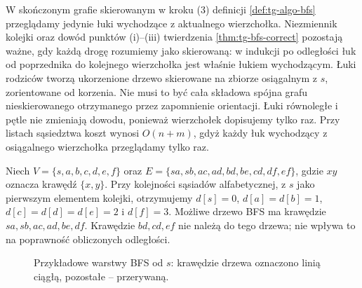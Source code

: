 \begin{uwaga}
\label{rem:tg-bfs-directed}
W skończonym grafie skierowanym w kroku (3)
definicji \ref{def:tg-algo-bfs} przeglądamy jedynie
łuki wychodzące z aktualnego wierzchołka.
Niezmiennik kolejki oraz dowód punktów (i)--(iii)
twierdzenia \ref{thm:tg-bfs-correct} pozostają
ważne, gdy każdą drogę rozumiemy jako skierowaną:
w indukcji po odległości łuk od poprzednika
do kolejnego wierzchołka jest właśnie łukiem
wychodzącym. Łuki rodziców tworzą ukorzenione
drzewo skierowane na zbiorze osiągalnym z $s$,
zorientowane od korzenia. Nie musi to być cała
składowa spójna grafu nieskierowanego otrzymanego
przez zapomnienie orientacji.
Łuki równoległe i pętle nie zmieniają dowodu,
ponieważ wierzchołek dopisujemy tylko raz.
Przy listach sąsiedztwa koszt wynosi $O(n+m)$,
gdyż każdy łuk wychodzący z osiągalnego wierzchołka
przeglądamy tylko raz.
\end{uwaga}

\begin{przyklad}
\label{ex:tg-bfs-layers}
Niech $V=\{s,a,b,c,d,e,f\}$ oraz
$E=\{sa,sb,ac,ad,bd,be,cd,df,ef\}$, gdzie
$xy$ oznacza krawędź $\{x,y\}$.
Przy kolejności sąsiadów alfabetycznej, z $s$ jako
pierwszym elementem kolejki, otrzymujemy
$d[s]=0$, $d[a]=d[b]=1$,
$d[c]=d[d]=d[e]=2$ i $d[f]=3$.
Możliwe drzewo BFS ma krawędzie
$sa,sb,ac,ad,be,df$.
Krawędzie $bd,cd,ef$ nie należą do tego drzewa;
nie wpływa to na poprawność obliczonych odległości.
\end{przyklad}

\begin{figure}[htbp]
\centering
{}
\caption{Przykładowe warstwy BFS od $s$: krawędzie drzewa
oznaczono linią ciągłą, pozostałe -- przerywaną.}
\label{fig:tg-bfs-layers}
\end{figure}

